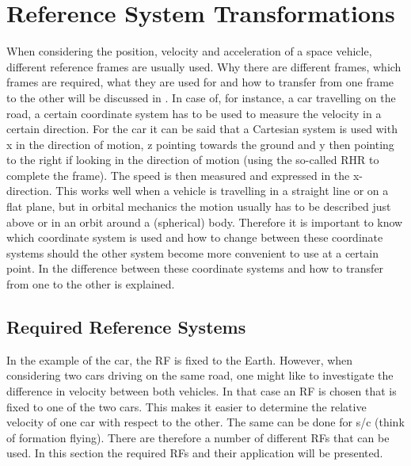 \chapter{Reference System Transformations}
\label{app:appendixAA-referenceSystemTransformations}
When considering the position, velocity and acceleration of a space vehicle, different reference frames are usually used. Why there are different frames, which frames are required, what they are used for and how to transfer from one frame to the other will be discussed in . In case of, for instance, a car travelling on the road, a certain coordinate system has to be used to measure the velocity in a certain direction. For the car it can be said that a Cartesian system is used with x in the direction of motion, z pointing towards the ground and y then pointing to the right if looking in the direction of motion (using the so-called \ac{RHR} to complete the frame). The speed is then measured and expressed in the x-direction. This works well when a vehicle is travelling in a straight line or on a flat plane, but in orbital mechanics the motion usually has to be described just above or in an orbit around a (spherical) body. Therefore it is important to know which coordinate system is used and how to change between these coordinate systems should the other system become more convenient to use at a certain point. In  the difference between these coordinate systems and how to transfer from one to the other is explained. 


\section{Required Reference Systems}
\label{sec:reqrefsys}
In the example of the car, the \acf{RF} is fixed to the Earth. However, when considering two cars driving on the same road, one might like to investigate the difference in velocity between both vehicles. In that case an \ac{RF} is chosen that is fixed to one of the two cars. This makes it easier to determine the relative velocity of one car with respect to the other. The same can be done for \ac{s/c} (think of formation flying). There are therefore a number of different \ac{RF}s that can be used. In this section the required \ac{RF}s and their application will be presented.



